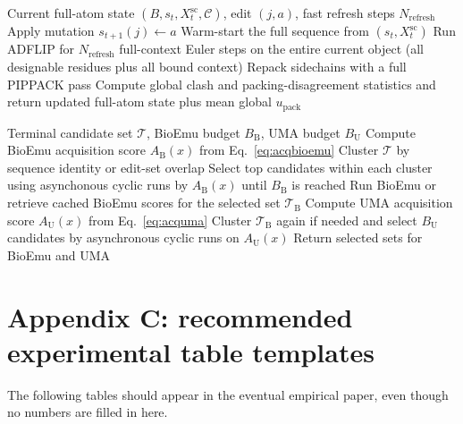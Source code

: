 \documentclass[11pt]{article}
\newcommand{\packunc}{\ensuremath{u_{\mathrm{pack}}}}
\newcommand{\Cx}{\mathcal{C}}
\begin{document}
\begin{algorithm}[H]
\caption{Full-context ADFLIP refresh and repacking after a single accepted edit}
\label{alg:repack}
\begin{algorithmic}[1]
\Require Current full-atom state $(B,s_t,X_t^{\mathrm{sc}},\Cx)$, edit $(j,a)$, fast refresh steps $N_{\mathrm{refresh}}$
\State Apply mutation $s_{t+1}(j)\leftarrow a$
\State Warm-start the full sequence from $(s_t,X_t^{\mathrm{sc}})$
\State Run ADFLIP for $N_{\mathrm{refresh}}$ full-context Euler steps on the entire current object (all designable residues plus all bound context)
\State Repack sidechains with a full PIPPACK pass
\State Compute global clash and packing-disagreement statistics and return updated full-atom state plus mean global \packunc
\end{algorithmic}
\end{algorithm}

\begin{algorithm}[H]
\caption{Selecting candidates for BioEmu and UMA branches}
\label{alg:acquire}
\begin{algorithmic}[1]
\Require Terminal candidate set $\mathcal{T}$, BioEmu budget $B_{\mathrm B}$, UMA budget $B_{\mathrm U}$
    \State Compute BioEmu acquisition score $A_{\mathrm B}(x)$ from Eq.~\eqref{eq:acqbioemu}
\EndFor
\State Cluster $\mathcal{T}$ by sequence identity or edit-set overlap
\State Select top candidates within each cluster using asynchonous cyclic runs by $A_{\mathrm B}(x)$ until $B_{\mathrm B}$ is reached
\State Run BioEmu or retrieve cached BioEmu scores for the selected set $\mathcal{T}_{\mathrm B}$
    \State Compute UMA acquisition score $A_{\mathrm U}(x)$ from Eq.~\eqref{eq:acquma}
\EndFor
\State Cluster $\mathcal{T}_{\mathrm B}$ again if needed and select $B_{\mathrm U}$ candidates by asynchronous cyclic runs on $A_{\mathrm U}(x)$
\State Return selected sets for BioEmu and UMA
\end{algorithmic}
\end{algorithm}


\section{Appendix C: recommended experimental table templates}

The following tables should appear in the eventual empirical paper, even though no numbers are filled in here.
\end{document}
